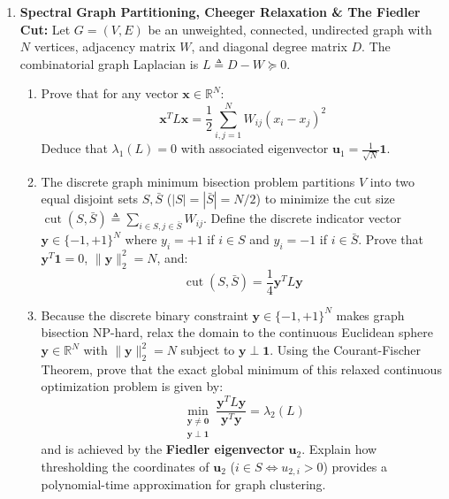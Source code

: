 \begin{enumerate}[label=\textbf{P\arabic*.}]
    \item \textbf{Spectral Graph Partitioning, Cheeger Relaxation \& The Fiedler Cut:}
    Let $G = (V, E)$ be an unweighted, connected, undirected graph with $N$ vertices, adjacency matrix $W$, and diagonal degree matrix $D$. The combinatorial graph Laplacian is $L \triangleq D - W \succeq 0$.
    \begin{enumerate}[label=(\alph*)]
        \item Prove that for any vector $\mathbf{x} \in \mathbb{R}^N$:
        \begin{equation*}
        \mathbf{x}^T L \mathbf{x} = \frac{1}{2}\sum_{i,j=1}^N W_{ij}(x_i - x_j)^2
        \end{equation*}
        Deduce that $\lambda_1(L) = 0$ with associated eigenvector $\mathbf{u}_1 = \frac{1}{\sqrt{N}}\mathbf{1}$.
        \item The discrete graph minimum bisection problem partitions $V$ into two equal disjoint sets $S, \bar{S}$ ($|S| = |\bar{S}| = N/2$) to minimize the cut size $\operatorname{cut}(S, \bar{S}) \triangleq \sum_{i \in S, j \in \bar{S}} W_{ij}$. Define the discrete indicator vector $\mathbf{y} \in \{-1, +1\}^N$ where $y_i = +1$ if $i \in S$ and $y_i = -1$ if $i \in \bar{S}$.
        Prove that $\mathbf{y}^T \mathbf{1} = 0$, $\|\mathbf{y}\|_2^2 = N$, and:
        \begin{equation*}
        \operatorname{cut}(S, \bar{S}) = \frac{1}{4} \mathbf{y}^T L \mathbf{y}
        \end{equation*}
        \item Because the discrete binary constraint $\mathbf{y} \in \{-1, +1\}^N$ makes graph bisection NP-hard, relax the domain to the continuous Euclidean sphere $\mathbf{y} \in \mathbb{R}^N$ with $\|\mathbf{y}\|_2^2 = N$ subject to $\mathbf{y} \perp \mathbf{1}$.
        Using the Courant-Fischer Theorem, prove that the exact global minimum of this relaxed continuous optimization problem is given by:
        \begin{equation*}
        \min_{\substack{\mathbf{y} \ne \mathbf{0} \\ \mathbf{y} \perp \mathbf{1}}} \frac{\mathbf{y}^T L \mathbf{y}}{\mathbf{y}^T \mathbf{y}} = \lambda_2(L)
        \end{equation*}
        and is achieved by the \textbf{Fiedler eigenvector} $\mathbf{u}_2$. Explain how thresholding the coordinates of $\mathbf{u}_2$ ($i \in S \iff u_{2,i} > 0$) provides a polynomial-time approximation for graph clustering.
    \end{enumerate}
\end{enumerate}

